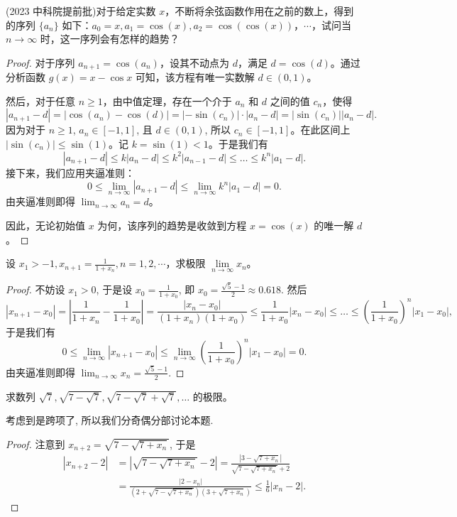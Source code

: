 \documentclass[lang=cn,10pt,thmcnt=section]{elegantbook}
\begin{document}
\begin{example}
	(2023 中科院提前批)对于给定实数 \( x \)，不断将余弦函数作用在之前的数上，得到的序列 \(\{a_n\}\) 如下：\( a_0 = x, a_1 = \cos(x), a_2 = \cos(\cos(x)) \)，\(\cdots\)，试问当 \( n \to \infty \) 时，这一序列会有怎样的趋势？
\end{example}
\begin{proof}
	对于序列 $a_{n+1} = \cos(a_n)$，设其不动点为 $d$，满足 $d = \cos(d)$。通过分析函数 $g(x)=x-\cos x$ 可知，该方程有唯一实数解 $d \in (0, 1)$。

然后，对于任意 $n \ge 1$，由中值定理，存在一个介于 $a_n$ 和 $d$ 之间的值 $c_n$，使得
$$ |a_{n+1} - d| = |\cos(a_n) - \cos(d)| = |-\sin(c_n)| \cdot |a_n - d| = |\sin(c_n)||a_n - d|. $$
因为对于 $n \ge 1$, $a_n \in [-1, 1]$, 且 $d \in (0, 1)$, 所以 $c_n \in [-1, 1]$。在此区间上 $|\sin(c_n)| \le \sin(1)$。记 $k = \sin(1) < 1$。于是我们有
$$ |a_{n+1} - d| \le k|a_n - d| \le k^2|a_{n-1}-d| \le \dots \le k^n |a_1 - d|. $$
接下来，我们应用夹逼准则：
$$ 0 \le \lim_{n \to \infty} |a_{n+1} - d| \le \lim_{n \to \infty} k^n |a_1 - d| = 0. $$
由夹逼准则即得 $\lim_{n \to \infty} a_n = d$。

因此，无论初始值 $x$ 为何，该序列的趋势是收敛到方程 $x = \cos(x)$ 的唯一解 $d$。

	
\end{proof}
\begin{example}
	设 \(x_1 > -1, x_{n+1} = \frac{1}{1+x_n}, n = 1, 2, \cdots\)，求极限 \(\lim\limits_{n \to \infty} x_n\)。
\end{example}
\begin{proof}
	不妨设 $x_1 > 0$, 于是设 $x_0 = \frac{1}{1+x_0}$, 即 $x_0 = \frac{\sqrt{5}-1}{2} \approx 0.618$. 然后
$$|x_{n+1} - x_0| = \left|\frac{1}{1+x_n} - \frac{1}{1+x_0}\right| = \frac{|x_n - x_0|}{(1+x_n)(1+x_0)} \le \frac{1}{1+x_0}|x_n - x_0| \le \dots \le \left(\frac{1}{1+x_0}\right)^n |x_1 - x_0|,$$
于是我们有
$$0 \le \lim_{n \to \infty} |x_{n+1} - x_0| \le \lim_{n \to \infty} \left(\frac{1}{1+x_0}\right)^n |x_1 - x_0| = 0.$$
由夹逼准则即得 $\lim_{n \to \infty} x_n = \frac{\sqrt{5}-1}{2}$.

\end{proof}
\begin{example}
	求数列 \(\sqrt{7}, \sqrt{7-\sqrt{7}}, \sqrt{7-\sqrt{7}+\sqrt{7}}, \ldots\) 的极限。
\end{example}

\begin{remark}
	考虑到是跨项了, 所以我们分奇偶分部讨论本题.
\end{remark}
\begin{proof}
	注意到 $x_{n+2} = \sqrt{7 - \sqrt{7+x_n}}$, 于是
\begin{align*}
|x_{n+2} - 2| &= \left|\sqrt{7-\sqrt{7+x_n}} - 2\right| = \frac{|3-\sqrt{7+x_n}|}{\sqrt{7-\sqrt{7+x_n}}+2} \\
&= \frac{|2-x_n|}{(2+\sqrt{7-\sqrt{7+x_n}})(3+\sqrt{7+x_n})} \le \frac{1}{6}|x_n - 2|.
\end{align*}
\end{proof}
\end{document}
